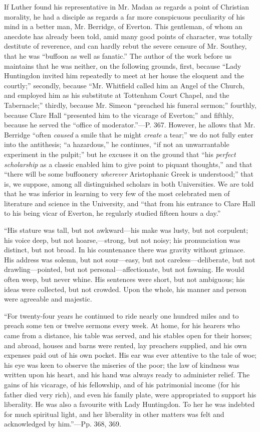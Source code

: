 If Luther found his representative in Mr. Madan
as regards a point of Christian morality, he had a disciple as regards
a far more conspicuous peculiarity of his mind in a better man, Mr.
Berridge, of Everton. This gentleman, of whom an anecdote has already
been told, amid many good points of character, was totally destitute
of reverence, and can hardly rebut the severe censure of Mr.
Southey, that he was ``buffoon as well as fanatic.'' The author of the
work before us maintains that he was neither, on the following
grounds, first, because ``Lady Huntingdon invited him repeatedly to
meet at her house the eloquent and the courtly;'' secondly, because ``Mr.
Whitfield called him an Angel of the Church, and employed him as his
substitute at Tottenham Court Chapel, and the Tabernacle;'' thirdly,
because Mr. Simeon ``preached his funeral sermon;'' fourthly, because
Clare Hall ``presented him to the vicarage of Everton;'' and fifthly,
because he served the ``office of moderator.''—P. 367. However, he
allows that Mr. Berridge ``often \emph{caused} a smile that he might \emph{create}
a tear;'' we do not fully enter into the antithesis; ``a hazardous,'' he
continues, ``if not an unwarrantable experiment in the pulpit;'' but he
excuses it on the ground that ``his \emph{perfect scholarship} as a
classic enabled him to give point to piquant thoughts,'' and that ``there
will be some buffoonery \emph{wherever} Aristophanic Greek is
understood;'' that is, we suppose, among all distinguished scholars in
both Universities. We are told that he was inferior in learning to
very few of the most celebrated men of literature and science in the
University, and ``that from his entrance to Clare Hall to his being
vicar of Everton, he regularly studied fifteen hours a day.''

``His
stature was tall, but not awkward—his make was lusty, but not
corpulent; his voice deep, but not hoarse,—strong, but not noisy;
his pronunciation was distinct, but not broad. In his countenance
there was gravity without grimace. His address was solemn, but not
sour—easy, but not careless—deliberate, but not
drawling—pointed, but not personal—affectionate, but not fawning.
He would often weep, but never whine. His sentences were short, but
not ambiguous; his ideas were collected, but not crowded. Upon the
whole, his manner and person were agreeable and majestic.

``For
twenty-four years he continued to ride nearly one hundred miles and to
preach some ten or twelve sermons every week. At home, for his hearers
who came from a distance, his table was served, and his stables open
for their horses; and abroad, houses and barns were rented, lay
preachers supplied, and his own expenses paid out of his own pocket.
His ear was ever attentive to the tale of woe; his eye was keen to
observe the miseries of the poor; the law of kindness was written upon
his heart, and his hand was always ready to administer relief. The
gains of his vicarage, of his fellowship, and of his patrimonial
income (for his father died very rich), and even his family plate,
were appropriated to support his liberality. He was also a favourite
with Lady Huntingdon. To her he was indebted for much spiritual light,
and her liberality in other matters was felt and acknowledged by him.''—Pp.
368, 369.

